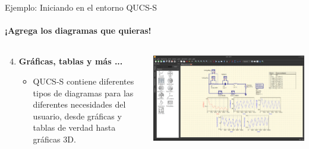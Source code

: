 \documentclass{beamer}
\begin{document}
\begin{frame}[fragile]{Ejemplo: Iniciando en el entorno QUCS-S}
  \framesubtitle{¡Agrega los diagramas que quieras!}

  \begin{columns}[T]
    \begin{column}{0.5\textwidth}
      \begin{enumerate}
        \setcounter{enumi}{3} %
        \item \textbf{Gráficas, tablas y más ...}
          \begin{itemize}
            \item QUCS-S contiene diferentes tipos de diagramas para las diferentes necesidades del usuario, desde gráficas y tablas de verdad hasta gráficas 3D.
          \end{itemize}
      \end{enumerate}
    \end{column}

    \begin{column}{0.5\textwidth}
      \includegraphics[width=\columnwidth]{Imagenes/Final.png}
    \end{column}
  \end{columns}
\end{frame}
\end{document}
